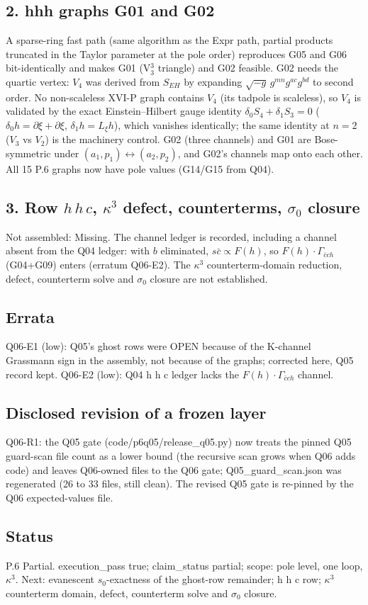 \subsection*{2. hhh graphs G01 and G02}
A sparse-ring fast path (same algorithm as the Expr path, partial products truncated in the Taylor parameter at the
pole order) reproduces G05 and G06 bit-identically and makes G01 (V$_3^3$ triangle) and G02 feasible.
G02 needs the quartic vertex: $V_4$ was derived from $S_{EH}$ by expanding $\sqrt{-g}\,g^{mn}g^{ac}g^{bd}$ to second
order.  No non-scaleless XVI-P graph contains $V_4$ (its tadpole is scaleless), so $V_4$ is validated by the exact
Einstein--Hilbert gauge identity $\delta_0S_4+\delta_1S_3=0$ ($\delta_0h=\partial\xi+\partial\xi$,
$\delta_1h=L_\xi h$), which vanishes identically; the same identity at $n=2$ ($V_3$ vs $V_2$) is the machinery control.
G02 (three channels) and G01 are Bose-symmetric under $(a_1,p_1)\leftrightarrow(a_2,p_2)$, and G02's channels map onto
each other.  All 15 P.6 graphs now have pole values (G14/G15 from Q04).

\subsection*{3. Row $h\,h\,c$, $\kappa^3$ defect, counterterms, $\sigma_0$ closure}
Not assembled: Missing.  The channel ledger is recorded, including a channel absent from the Q04 ledger: with $b$
eliminated, $s\bar c\propto F(h)$, so $F(h)\cdot\Gamma_{\bar c c h}$ (G04+G09) enters (erratum Q06-E2).  The
$\kappa^3$ counterterm-domain reduction, defect, counterterm solve and $\sigma_0$ closure are not established.

\subsection*{Errata}
Q06-E1 (low): Q05's ghost rows were OPEN because of the K-channel Grassmann sign in the assembly, not because of the
graphs; corrected here, Q05 record kept.  Q06-E2 (low): Q04 h h c ledger lacks the $F(h)\cdot\Gamma_{\bar cch}$ channel.

\subsection*{Disclosed revision of a frozen layer}
Q06-R1: the Q05 gate (code/p6q05/release\_q05.py) now treats the pinned Q05 guard-scan file count as a lower bound
(the recursive scan grows when Q06 adds code) and leaves Q06-owned files to the Q06 gate; Q05\_guard\_scan.json was
regenerated (26 to 33 files, still clean).  The revised Q05 gate is re-pinned by the Q06 expected-values file.

\subsection*{Status}
P.6 Partial.  execution\_pass true; claim\_status partial; scope: pole level, one loop, $\kappa^3$.
Next: evanescent $s_0$-exactness of the ghost-row remainder; h h c row; $\kappa^3$ counterterm domain, defect,
counterterm solve and $\sigma_0$ closure.
